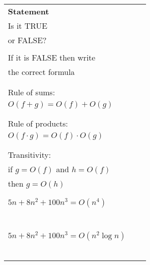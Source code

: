 \documentclass[]{article}
\begin{document}
\begin{enumerate}
{\footnotesize
\begin{tabular}{|l|l|l|} \hline
{\bf Statement} & 
\begin{minipage}{20mm} ~~\\
Is it TRUE\\
or FALSE? \\ 
\end{minipage}& 
\begin{minipage}{35mm} ~~\\
If it is FALSE then write\\
the correct formula \\
\end{minipage} \\ \hline
\begin{minipage}{40mm}~~\\
Rule of sums:\\
 $O(f + g) = O(f) + O(g)$\\ 
\end{minipage}                &      &  \\ \hline
\begin{minipage}{40mm}~~\\
Rule of products:\\
 $O(f \cdot g) = O(f) \cdot O(g)$ \\
\end{minipage}                &      &  \\ \hline
\begin{minipage}{40mm}~~\\
Transitivity: \\
if $g = O(f)$ and $h = O(f)$ \\
then $g = O(h)$ \\
\end{minipage}                &      & \\ \hline
\begin{minipage}{40mm}~~\\
$5n + 8n^{2} + 100n^{3} = O(n^{4})$\\
~~~ \\
\end{minipage}                &      &  \\ \hline
\begin{minipage}{40mm}~~\\
$5n + 8n^{2} + 100n^{3} = O(n^{2} \log n)$\\
~~~\\
\end{minipage}                &      &  \\ \hline
\end{tabular}}


\end{enumerate}
\end{document}
